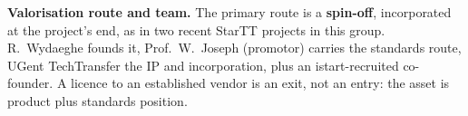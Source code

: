 \documentclass[10pt,a4paper]{article}
\begin{document}
\textbf{Valorisation route and team.} The primary route is a \textbf{spin-off}, incorporated at the project's end, as in two recent
StarTT projects in this group. R.~Wydaeghe founds it, Prof.~W.~Joseph (promotor) carries the standards route, UGent TechTransfer the IP and incorporation, plus an istart-recruited co-founder. A licence to an
established vendor is an exit, not an entry: the asset is product plus standards position.
\end{document}
